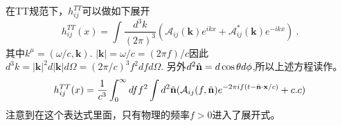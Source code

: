 在TT规范下，$h^{TT}_{ij}$可以做如下展开
\begin{equation}
h^{TT}_{ij}(x) = \int \frac{d^3 k}{(2\pi)^3} (\mathcal A_{ij}(\mathbf k) e^{ikx} + \mathcal A_{ij}^* (\mathbf k) e^{-i k x} ) ~. 
\end{equation}
其中$k^\mu = (\omega/c,\mathbf k)$. $|\mathbf k| = \omega/c = (2\pi f)/c$因此$d^3 k = |\mathbf k|^2 d|\mathbf k| d\Omega = (2\pi/c)^3 f^2 df d\Omega $. 另外$d^2\hat{\bf{n}} = d\cos\theta d\phi$,所以上述方程读作。
\begin{equation}
h^{TT}_{ij}(x) = \frac{1}{c^3} \int^\infty_0 df f^2 \int d^2 \hat{ \bf{n} } ( \mathcal A_{ij} (f,\hat{ \bf{n} }) e^{-2\pi i f(t-\hat{ {\bf n} } \cdot {\bf x} /c  )}  + {c.c} ) 
\end{equation}
注意到在这个表达式里面，只有物理的频率$f>0$进入了展开式。


















